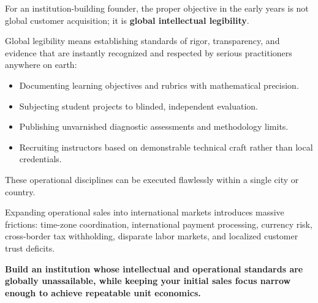 For an institution-building founder, the proper objective in the early years is not global customer acquisition; it is \textbf{global intellectual legibility}.

Global legibility means establishing standards of rigor, transparency, and evidence that are instantly recognized and respected by serious practitioners anywhere on earth:

\begin{itemize}[leftmargin=11pt,itemsep=1.5pt,topsep=1.5pt,parsep=0pt]
  \item Documenting learning objectives and rubrics with mathematical precision.
  \item Subjecting student projects to blinded, independent evaluation.
  \item Publishing unvarnished diagnostic assessments and methodology limits.
  \item Recruiting instructors based on demonstrable technical craft rather than local credentials.
\end{itemize}

These operational disciplines can be executed flawlessly within a single city or country.

Expanding operational sales into international markets introduces massive frictions: time-zone coordination, international payment processing, currency risk, cross-border tax withholding, disparate labor markets, and localized customer trust deficits.

\textbf{Build an institution whose intellectual and operational standards are globally unassailable, while keeping your initial sales focus narrow enough to achieve repeatable unit economics.}
